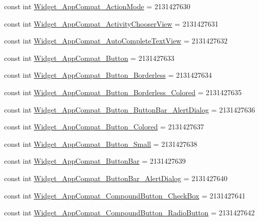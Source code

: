 \begin{CompactItemize}
\item 
const int \hyperlink{class__2doo_1_1_droid_1_1_resource_1_1_style_68d4af1979639d17ebf1560a3b228703}{Widget\_\-AppCompat\_\-ActionMode} = 2131427630
\item 
const int \hyperlink{class__2doo_1_1_droid_1_1_resource_1_1_style_6d7ef3040c3f20e01762375a4434a012}{Widget\_\-AppCompat\_\-ActivityChooserView} = 2131427631
\item 
const int \hyperlink{class__2doo_1_1_droid_1_1_resource_1_1_style_723bd7ec45db28e4174890b0605f7325}{Widget\_\-AppCompat\_\-AutoCompleteTextView} = 2131427632
\item 
const int \hyperlink{class__2doo_1_1_droid_1_1_resource_1_1_style_642058c0cfa640ce6afcdc5f2f1ae344}{Widget\_\-AppCompat\_\-Button} = 2131427633
\item 
const int \hyperlink{class__2doo_1_1_droid_1_1_resource_1_1_style_3505014a7704fb346d0d4094cdecf402}{Widget\_\-AppCompat\_\-Button\_\-Borderless} = 2131427634
\item 
const int \hyperlink{class__2doo_1_1_droid_1_1_resource_1_1_style_6984db261e6234b254ca5b568137d4fb}{Widget\_\-AppCompat\_\-Button\_\-Borderless\_\-Colored} = 2131427635
\item 
const int \hyperlink{class__2doo_1_1_droid_1_1_resource_1_1_style_7c275a75767525cce56be38280cde0ab}{Widget\_\-AppCompat\_\-Button\_\-ButtonBar\_\-AlertDialog} = 2131427636
\item 
const int \hyperlink{class__2doo_1_1_droid_1_1_resource_1_1_style_f99f3f960a27e9e7408be02d54b8c1c2}{Widget\_\-AppCompat\_\-Button\_\-Colored} = 2131427637
\item 
const int \hyperlink{class__2doo_1_1_droid_1_1_resource_1_1_style_dbef803f938093676a12bcd98eb8026e}{Widget\_\-AppCompat\_\-Button\_\-Small} = 2131427638
\item 
const int \hyperlink{class__2doo_1_1_droid_1_1_resource_1_1_style_b3c7f25b378e641e00e8b722d1fa3c41}{Widget\_\-AppCompat\_\-ButtonBar} = 2131427639
\item 
const int \hyperlink{class__2doo_1_1_droid_1_1_resource_1_1_style_ff129c5045e91b0fab9be68d113b012f}{Widget\_\-AppCompat\_\-ButtonBar\_\-AlertDialog} = 2131427640
\item 
const int \hyperlink{class__2doo_1_1_droid_1_1_resource_1_1_style_8a63962f437dadef671ccaed50e37d1f}{Widget\_\-AppCompat\_\-CompoundButton\_\-CheckBox} = 2131427641
\item 
const int \hyperlink{class__2doo_1_1_droid_1_1_resource_1_1_style_b2b28304103ecf68bb49e6ca986098b9}{Widget\_\-AppCompat\_\-CompoundButton\_\-RadioButton} = 2131427642

\end{CompactItemize}
